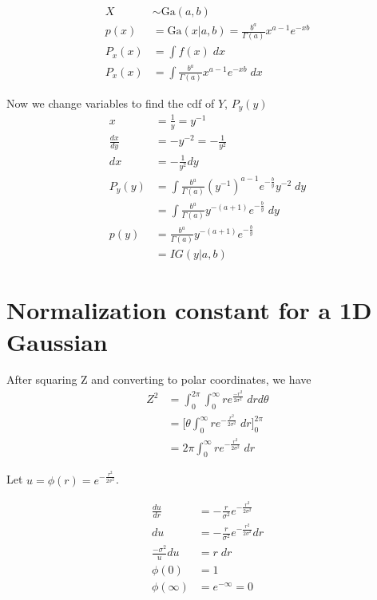 \documentclass{article}
\begin{document}
\begin{align*}
  X &\sim \text{Ga}(a,b) \\
  p(x) &= \text{Ga}(x|a,b) = \frac{b^a}{\Gamma(a)} x^{a-1}e^{-xb} \\
  P_{x}(x) &= \int{f(x) \; dx} \\
  P_{x}(x) &= \int{\frac{b^{a}}{\Gamma(a)} x^{a-1} e^{-xb} \; dx}
\end{align*}

Now we change variables to find the cdf of $Y$, $P_{y}(y)$
\begin{align*}
  x &= \frac{1}{y} = y^{-1} \\
  \frac{dx}{dy} &= -y^{-2} = -\frac{1}{y^{2}} \\
  dx &= -\frac{1}{y^{2}} dy \\
  P_{y}(y) &= \int{ \frac{b^{a}}{\Gamma(a)}
             \left( y^{-1} \right) ^{a-1} e^{-\frac{b}{y}}
             y^{-2} \; dy} \\
    &= \int{ \frac{b^{a}}{\Gamma(a)}
      y^{-(a+1)} e^{-\frac{b}{y}}} \; dy \\
  p(y) &= \frac{b^{a}}{\Gamma(a)}
      y^{-(a+1)} e^{-\frac{b}{y}} \\
  &= IG(y|a,b)
\end{align*}

\section{Normalization constant for a 1D Gaussian}

After squaring Z and converting to polar coordinates, we have
\begin{align*}
  Z^{2} &= \int_0^{2\pi} \int_0^\infty re^{\frac{-r^{2}}{2\sigma^{2}}}
          \; dr d\theta \\
  &= \Big[ \theta \int_0^\infty{re^{-\frac{r^{2}}{2\sigma^{2}}} \; dr}
    \Big]_0^{2\pi} \\
  &= 2\pi \int_0^\infty{re^{-\frac{r^{2}}{2\sigma^{2}}}} \; dr
\end{align*}

Let $u = \phi(r) = e^{-\frac{r^{2}}{2\sigma^{2}}}$.

\begin{align*}
  \frac{du}{dr} &= -\frac{r}{\sigma^{2}}
                  e^{-\frac{r^{2}}{2\sigma^{2}}} \\
  du &= -\frac{r}{\sigma^{2}}
                  e^{-\frac{r^{2}}{2\sigma^{2}}} dr \\
  \frac{-\sigma^{2}}{u} du &= r \; dr \\
  \phi(0) &= 1 \\
  \phi(\infty) &= e^{-\infty} = 0
\end{align*}
\end{document}
